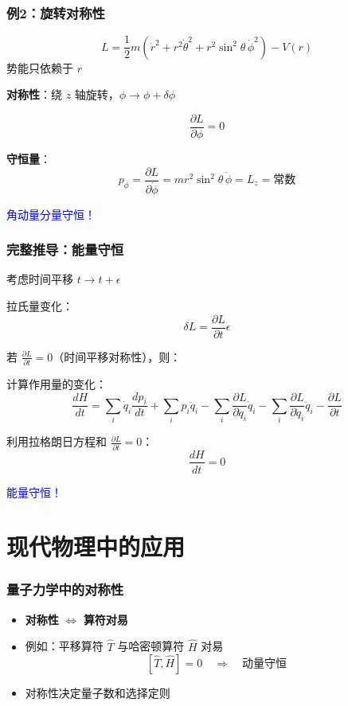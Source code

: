 \documentclass[xcolor=dvipsnames]{ctexbeamer}
\begin{document}
\begin{frame}
\frametitle{例2：旋转对称性}
\begin{example}[中心力场]
$$L = \frac{1}{2}m(\dot{r}^2 + r^2\dot{\theta}^2 + r^2\sin^2\theta \, \dot{\phi}^2) - V(r)$$
势能只依赖于 $r$
\end{example}

\pause

\textbf{对称性}：绕 $z$ 轴旋转，$\phi \to \phi + \delta\phi$

\pause

$$\frac{\partial L}{\partial \phi} = 0$$

\pause

\textbf{守恒量}：
$$p_\phi = \frac{\partial L}{\partial \dot{\phi}} = mr^2\sin^2\theta \, \dot{\phi} = L_z = \text{常数}$$

\textcolor{blue}{角动量分量守恒！}
\end{frame}

\begin{frame}
\frametitle{完整推导：能量守恒}
考虑时间平移 $t \to t + \epsilon$

\pause

拉氏量变化：
$$\delta L = \frac{\partial L}{\partial t} \epsilon$$

\pause

若 $\frac{\partial L}{\partial t} = 0$（时间平移对称性），则：

\pause

计算作用量的变化：
$$\frac{dH}{dt} = \sum_i \dot{q}_i \frac{dp_i}{dt} + \sum_i p_i \ddot{q}_i - \sum_i \frac{\partial L}{\partial q_i}\dot{q}_i - \sum_i \frac{\partial L}{\partial \dot{q}_i}\ddot{q}_i - \frac{\partial L}{\partial t}$$

\pause

利用拉格朗日方程和 $\frac{\partial L}{\partial t} = 0$：
$$\frac{dH}{dt} = 0$$

\textcolor{blue}{能量守恒！}
\end{frame}

\section{现代物理中的应用}

\begin{frame}
\frametitle{量子力学中的对称性}
\begin{itemize}
\item \textbf{对称性} $\Leftrightarrow$ \textbf{算符对易}
\pause
\item 例如：平移算符 $\hat{T}$ 与哈密顿算符 $\hat{H}$ 对易
$$[\hat{T}, \hat{H}] = 0 \quad \Rightarrow \quad \text{动量守恒}$$
\pause
\item 对称性决定量子数和选择定则
\end{itemize}
\end{frame}
\end{document}
